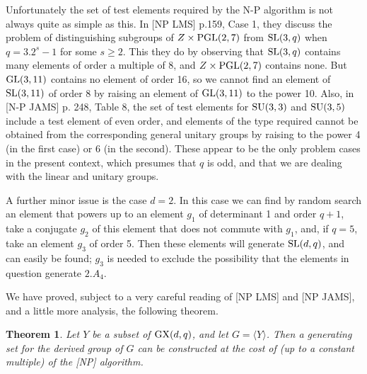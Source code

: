 \documentclass[12pt]{article}
\newtheorem{theorem}[definition]{Theorem}
\def\SL{{\rm SL}}
\def\GL{{\rm GL}}
\def\SU{{\rm SU}}
\def\GX{{\rm GX}}
\def\PGL{{\rm PGL}}
\begin{document}
Unfortunately the set of test elements required by the N-P algorithm is not always
quite as simple as this.  In [NP LMS] p.159, Case 1, they discuss the
problem of distinguishing subgroups of $Z\times \PGL(2,7)$ from $\SL(3,q)$ when
$q=3.2^s-1$ for some $s\ge2$.  This they do by observing that
$\SL(3,q)$ contains many elements of order a multiple of 8, and $Z\times\PGL(2,7)$
contains none.  But $\GL(3,11)$ contains no element of order 16, so we cannot
find an element of $\SL(3,11)$ of order 8 by raising an element of $\GL(3,11)$
to the power 10.  Also, in [N-P JAMS] p. 248, Table 8, the set of test elements
for $\SU(3,3)$ and $\SU(3,5)$ include a test element of even order, and
elements of the type required cannot be obtained from the corresponding
general unitary groups by raising to the power 4 (in the first case) or 6 (in the
second).  These appear to be the only problem cases in the present context,
which presumes that $q$ is odd, and that we are dealing with the linear and
unitary groups.

A further minor issue is the case $d=2$.  In this case we can find by random
search an element that powers up to an element $g_1$ of determinant 1 
and order $q+1$, take a conjugate $g_2$ of this element that does not
commute with $g_1$, and, if $q=5$, take an element $g_3$ of order 5.  Then these
elements will generate $\SL(d,q)$, and can easily be found;
$g_3$ is needed to exclude the possibility that the elements in question generate
$2.A_4$.

We have proved, subject to a very careful reading of [NP LMS] and
[NP JAMS], and a little more analysis, the following theorem.

\begin {theorem}
Let $Y$ be a subset of $\GX(d,q)$, and let $G=\langle Y\rangle$.  Then a generating set
for the derived group of $G$ can be constructed at the cost of (up to a
constant multiple)  of the [NP] algorithm.
\end{theorem}
\end{document}
